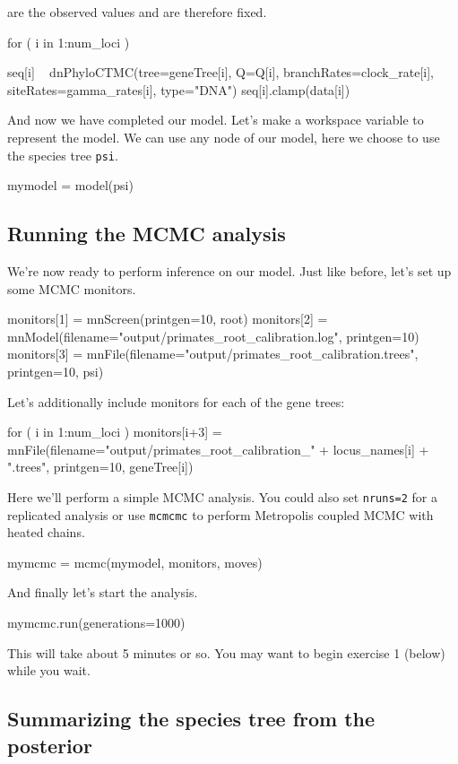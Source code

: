 \documentclass[11pt]{article}
\begin{document}
are the observed values and are therefore fixed.
\begin{code}
for ( i in 1:num_loci ) {
    
    seq[i] ~ dnPhyloCTMC(tree=geneTree[i], Q=Q[i], branchRates=clock_rate[i], 
                         siteRates=gamma_rates[i], type="DNA")
    seq[i].clamp(data[i])

}
\end{code}
And now we have completed our model.
Let's make a workspace variable to represent the model.
We can use any node of our model, here we choose to use the species tree \texttt{psi}.
\begin{code}
mymodel = model(psi)
\end{code}

\subsection{Running the MCMC analysis}

We're now ready to perform inference on our model. 
Just like before, let's set up some MCMC monitors.
\begin{code}
monitors[1] = mnScreen(printgen=10, root)
monitors[2] = mnModel(filename="output/primates_root_calibration.log", printgen=10)
monitors[3] = mnFile(filename="output/primates_root_calibration.trees", printgen=10, psi)
\end{code}
Let's additionally include monitors for each of the gene trees:
\begin{code}
for ( i in 1:num_loci ) {
    monitors[i+3] = mnFile(filename="output/primates_root_calibration_" + locus_names[i] + 
                                        ".trees", printgen=10, geneTree[i])
}
\end{code}
Here we'll perform a simple MCMC analysis. 
You could also set \texttt{nruns=2} for a replicated analysis
or use \texttt{mcmcmc} to perform Metropolis coupled MCMC with heated chains.
\begin{code}
mymcmc = mcmc(mymodel, monitors, moves)
\end{code}
And finally let's start the analysis. 
\begin{code}
mymcmc.run(generations=1000)
\end{code}
This will take about 5 minutes or so.
You may want to begin exercise 1 (below) while you wait.

\subsection{Summarizing the species tree from the posterior}
\end{document}
